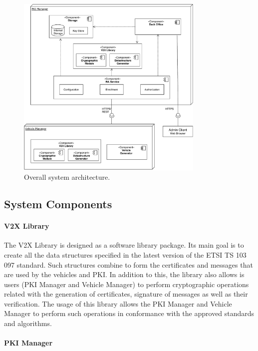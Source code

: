 \begin{figure}[!htb]
	\centering
	\includegraphics[width=0.8\textwidth]{Figures/arquitetura}
	\caption{\label{fig:system_arch}Overall system  architecture.}
\end{figure}

\subsection{System Components}

\paragraph{V2X Library}
\label{section:model}

The V2X Library is designed as a software library package. Its main goal is to create all the data structures specified in the latest version of the ETSI TS 103 097 standard. Such structures combine to form the certificates and messages that are used by the vehicles and PKI. In addition to this, the library also allows is users (PKI Manager and Vehicle Manager) to perform cryptographic operations related with the generation of certificates, signature of messages as well as their verification. The usage of this library allows the PKI Manager and Vehicle Manager to perform such operations in conformance with the approved standards and algorithms.

\paragraph{PKI Manager}
\label{section:model}

